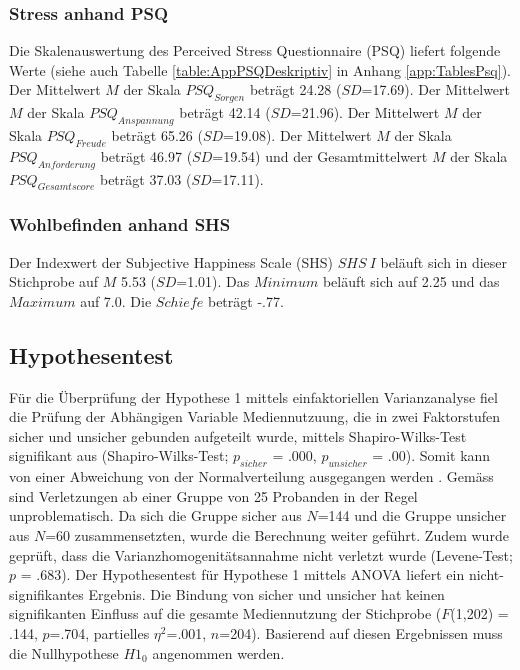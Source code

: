 \subsubsection{Stress anhand PSQ}
Die Skalenauswertung des Perceived Stress Questionnaire (PSQ) liefert folgende Werte (siehe auch Tabelle \ref{table:AppPSQDeskriptiv} in Anhang \ref{app:TablesPsq}). Der Mittelwert $M$ der Skala $PSQ_{Sorgen}$ beträgt 24.28 ($SD$=17.69). Der Mittelwert $M$ der Skala $PSQ_{Anspannung}$ beträgt 42.14 ($SD$=21.96). Der Mittelwert $M$ der Skala $PSQ_{Freude}$ beträgt 65.26 ($SD$=19.08). Der Mittelwert $M$ der Skala $PSQ_{Anforderung}$ beträgt 46.97 ($SD$=19.54) und der Gesamtmittelwert $M$ der Skala $PSQ_{Gesamtscore}$ beträgt 37.03 ($SD$=17.11).


\subsubsection{Wohlbefinden anhand SHS}
Der Indexwert der Subjective Happiness Scale (SHS) $SHS~I$ beläuft sich in dieser Stichprobe auf $M$ 5.53 ($SD$=1.01). Das $Minimum$ beläuft sich auf 2.25 und das $Maximum$ auf 7.0. Die $Schiefe$ beträgt -.77.

\subsection{Hypothesentest} \label{sec:Hypothesentest}
Für die Überprüfung der Hypothese 1 mittels einfaktoriellen Varianzanalyse fiel die Prüfung der Abhängigen Variable Mediennutzuung, die in zwei Faktorstufen sicher und unsicher gebunden aufgeteilt wurde, mittels Shapiro-Wilks-Test \cite{Shapiro1965} signifikant aus (Shapiro-Wilks-Test; $p_{sicher}$ = .000, $p_{unsicher}$ = .00). Somit kann von einer Abweichung von der Normalverteilung ausgegangen werden \cite{Hemmerich2018}. Gemäss  sind Verletzungen ab einer Gruppe von 25 Probanden in der Regel unproblematisch. Da sich die Gruppe sicher aus $N$=144 und die Gruppe unsicher aus $N$=60 zusammensetzten, wurde die Berechnung weiter geführt. Zudem wurde geprüft, dass die Varianzhomogenitätsannahme nicht verletzt wurde (Levene-Test; $p$ = .683). Der Hypothesentest für Hypothese 1 mittels ANOVA liefert ein nicht-signifikantes Er\-gebnis. Die Bindung von sicher und unsicher hat keinen signifikanten Einfluss auf die ge\-samte Medien\-nutzung der Stichprobe ($F$(1,202) = .144, $p$=.704, partielles $\eta^2$=.001, $n$=204). Basierend auf diesen Ergebnissen muss die Nullhypothese $H1_{0}$ angenommen werden. 


